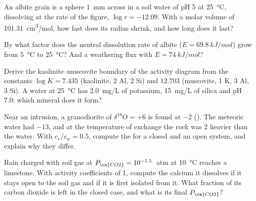 \begin{exercise}[$\star\star$]\label{exo:b3:water-rock-interaction:7}
An albite grain is a sphere \qty{1}{mm} across in a soil water of pH 5 at
\qty{25}{\celsius}, dissolving at the rate of the figure, $\log r = -12.09$.
With a molar volume of \qty{101.31}{cm^3/mol}, how fast does its radius
shrink, and how long does it last?
\end{exercise}

\begin{exercise}[$\star\star$]\label{exo:b3:water-rock-interaction:8}
By what factor does the neutral dissolution rate of albite ($E =
\qty{69.8}{kJ/mol}$) grow from \qty{5}{\celsius} to \qty{25}{\celsius}? And
a weathering flux with $E = \qty{74}{kJ/mol}$?
\end{exercise}

\begin{exercise}[$\star\star$]\label{exo:b3:water-rock-interaction:9}
Derive the kaolinite--muscovite boundary of the activity diagram from the
constants $\log K = 7.435$ (kaolinite, 2 Al, 2 Si) and $12.703$ (muscovite, 1
K, 3 Al, 3 Si). A water at \qty{25}{\celsius} has \qty{2.0}{mg/L} of
potassium, \qty{15}{mg/L} of silica and pH 7.0: which mineral does it form?
\end{exercise}

\begin{exercise}[$\star\star\star$]\label{exo:b3:water-rock-interaction:10}
Near an intrusion, a granodiorite of $\delta^{18}\mathrm O = +6$ is found
at $-2$ (\unit{\permil}). The meteoric water had $-13$, and at the
temperature of exchange the rock was \qty{2}{\permil} heavier than the
water. With $c_r/c_w = 0.5$, compute the  for a closed and
an open system, and explain why they differ.
\end{exercise}

\begin{exercise}[$\star\star\star$]\label{exo:b3:water-rock-interaction:11}
Rain charged with soil gas at $P_{\ce{CO2}} = 10^{-1.5}$~atm at
\qty{10}{\celsius} reaches a limestone. With activity coefficients of 1,
compute the calcium it dissolves if it stays open to the soil gas and if it
is first isolated from it. What fraction of its carbon dioxide is left in the
closed case, and what is its final $P_{\ce{CO2}}$?
\end{exercise}

